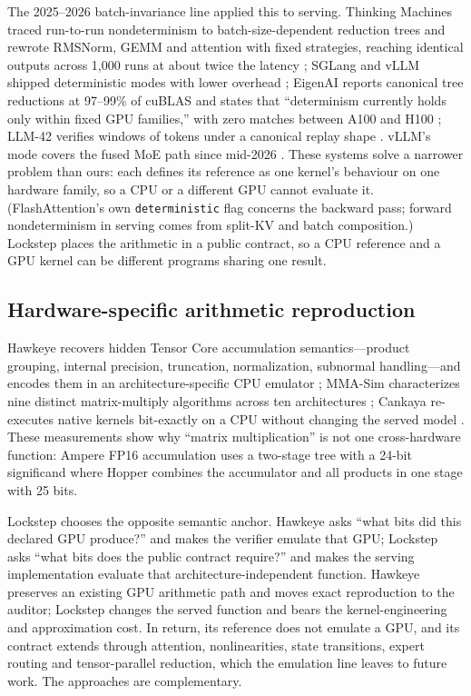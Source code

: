 \documentclass{article}
\begin{document}
The 2025--2026 batch-invariance line applied this to serving.  Thinking Machines traced
run-to-run nondeterminism to batch-size-dependent reduction trees and rewrote RMSNorm, GEMM
and attention with fixed strategies, reaching identical outputs across 1,000 runs at about
twice the latency \cite{he2025nondeterminism}; SGLang and vLLM shipped deterministic modes
with lower overhead \cite{sglang2025deterministic,vllm2026batchinvariance}; EigenAI reports
canonical tree reductions at 97--99\% of cuBLAS and states that ``determinism currently holds
only within fixed GPU families,'' with zero matches between A100 and H100 \cite{eigenai2026};
LLM-42 verifies windows of tokens under a canonical replay shape \cite{llm42}.  vLLM's mode covers the fused MoE path since mid-2026 \cite{vllm2026batchinvariance}.
These systems solve a narrower problem than ours: each defines its reference as one kernel's
behaviour on one hardware family, so a CPU or a different GPU cannot evaluate it.
(FlashAttention's own \texttt{deterministic} flag concerns the backward pass; forward
nondeterminism in serving comes from split-KV and batch composition.)  Lockstep places the
arithmetic in a public contract, so a CPU reference and a GPU kernel can be different
programs sharing one result.

\subsection{Hardware-specific arithmetic reproduction}

Hawkeye recovers hidden Tensor Core accumulation semantics---product grouping, internal
precision, truncation, normalization, subnormal handling---and encodes them in an
architecture-specific CPU emulator \cite{badash2026hawkeye}; MMA-Sim characterizes nine
distinct matrix-multiply algorithms across ten architectures \cite{mmasim2025}; Cankaya
re-executes native kernels bit-exactly on a CPU without changing the served model
\cite{cankaya2026bitexact}.  These measurements show why ``matrix multiplication'' is not one
cross-hardware function: Ampere FP16 accumulation uses a two-stage tree with a 24-bit
significand where Hopper combines the accumulator and all products in one stage with 25 bits.

Lockstep chooses the opposite semantic anchor.  Hawkeye asks ``what bits did this declared
GPU produce?'' and makes the verifier emulate that GPU; Lockstep asks ``what bits does the
public contract require?'' and makes the serving implementation evaluate that
architecture-independent function.  Hawkeye preserves an existing GPU arithmetic path and
moves exact reproduction to the auditor; Lockstep changes the served function and bears the
kernel-engineering and approximation cost.  In return, its reference does not emulate a GPU,
and its contract extends through attention, nonlinearities, state transitions, expert routing
and tensor-parallel reduction, which the emulation line leaves to future work.  The approaches
are complementary.
\end{document}
